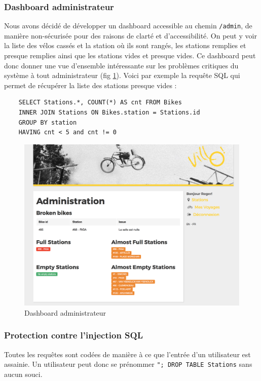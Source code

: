 \documentclass[a4paper]{article}
\begin{document}
    \subsubsection{Dashboard administrateur}
    Nous avons décidé de développer un dashboard accessible au chemin \texttt{/admin}, de manière non-sécurisée pour des raisons de clarté et d'accessibilité. On peut y voir la liste des vélos cassés et la station où ils sont rangés, les stations remplies et presque remplies ainsi que les stations vides et presque vides. Ce dashboard peut donc donner une vue d'ensemble intéressante sur les problèmes critiques du système à tout administrateur (fig \ref{fig-s22}). Voici par exemple la requête SQL qui permet de récupérer la liste des stations presque vides :\\

    \begin{verbatim}
    SELECT Stations.*, COUNT(*) AS cnt FROM Bikes
    INNER JOIN Stations ON Bikes.station = Stations.id
    GROUP BY station
    HAVING cnt < 5 and cnt != 0
    \end{verbatim}
    
    \begin{figure}
    \includegraphics[width=\textwidth]{images/s22.png}
    \caption{Dashboard administrateur}
    \label{fig-s22}
    \end{figure}

    \subsubsection{Protection contre l'injection SQL}
    Toutes les requêtes sont codées de manière à ce que l'entrée d'un utilisateur est assainie. Un utilisateur peut donc se prénommer \texttt{"; DROP TABLE Stations} sans aucun souci.\\
\end{document}
